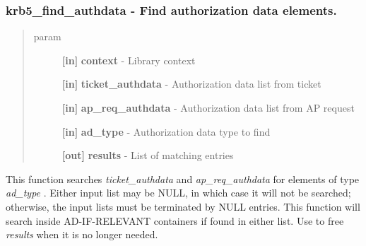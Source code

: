\documentclass[letterpaper,10pt,english]{sphinxmanual}
\begin{document}
\subsubsection{krb5\_find\_authdata -  Find authorization data elements.}
\label{appdev/refs/api/krb5_find_authdata:krb5-find-authdata-find-authorization-data-elements}\label{appdev/refs/api/krb5_find_authdata::doc}

\begin{fulllineitems}
\label{appdev/refs/api/krb5_find_authdata:c.krb5_find_authdata}
\end{fulllineitems}

\begin{quote}\begin{description}
\item[{param}] \leavevmode
\textbf{{[}in{]}} \textbf{context} - Library context

\textbf{{[}in{]}} \textbf{ticket\_authdata} - Authorization data list from ticket

\textbf{{[}in{]}} \textbf{ap\_req\_authdata} - Authorization data list from AP request

\textbf{{[}in{]}} \textbf{ad\_type} - Authorization data type to find

\textbf{{[}out{]}} \textbf{results} - List of matching entries

\end{description}\end{quote}

This function searches \emph{ticket\_authdata} and \emph{ap\_req\_authdata} for elements of type \emph{ad\_type} . Either input list may be NULL, in which case it will not be searched; otherwise, the input lists must be terminated by NULL entries. This function will search inside AD-IF-RELEVANT containers if found in either list. Use {\hyperref[appdev/refs/api/krb5_free_authdata:c.krb5_free_authdata]{}} to free \emph{results} when it is no longer needed.
\end{document}
